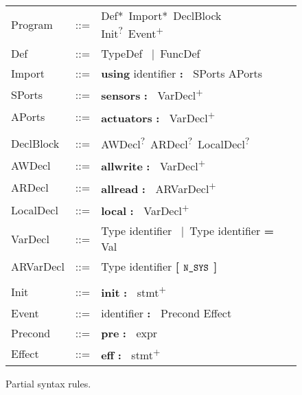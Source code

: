 \begin{figure}

\newcommand{\zeroone}{\textsuperscript{?}\ }
\newcommand{\zeromore}{*\ }
\newcommand{\onemore}{\textsuperscript{+}\ }
\newcommand{\vbar}{{\normalfont\ |\ }}
\newcommand{\mterm}[1]{{\normalfont \textbf{#1}}}
\newcommand{\delim}{\mterm{:\ }\xspace}

\itshape
\begin{tabular}{lrl}
    Program   & ::= & Def\zeromore Import\zeromore DeclBlock Init\zeroone Event\onemore \\
    Def       & ::= & TypeDef \vbar FuncDef                                             \\
    Import    & ::= & \mterm{using} identifier \delim SPorts APorts                     \\
    SPorts    & ::= & \mterm{sensors} \delim VarDecl\onemore                            \\
    APorts    & ::= & \mterm{actuators} \delim VarDecl\onemore                          \\
              &     &                                                                   \\
    DeclBlock & ::= & AWDecl\zeroone ARDecl\zeroone LocalDecl\zeroone                   \\
    AWDecl    & ::= & \mterm{allwrite} \delim VarDecl\onemore                           \\
    ARDecl    & ::= & \mterm{allread} \delim ARVarDecl\onemore                          \\
    LocalDecl & ::= & \mterm{local} \delim VarDecl\onemore                              \\
    VarDecl   & ::= & Type identifier \vbar Type identifier \mterm{=} Val               \\
    ARVarDecl & ::= & Type identifier \mterm{[ $\texttt{N\_SYS}$ ]}                               \\
              &     &                                                                   \\
    Init      & ::= & \mterm{init} \delim stmt\onemore                                  \\
    Event     & ::= & identifier \delim Precond Effect                                  \\
    Precond   & ::= & \mterm{pre} \delim expr                                           \\
    Effect    & ::= & \mterm{eff} \delim stmt\onemore
\end{tabular}

\caption{Partial \lgname syntax rules.}\label{fig:partial-syntax}
\end{figure}


